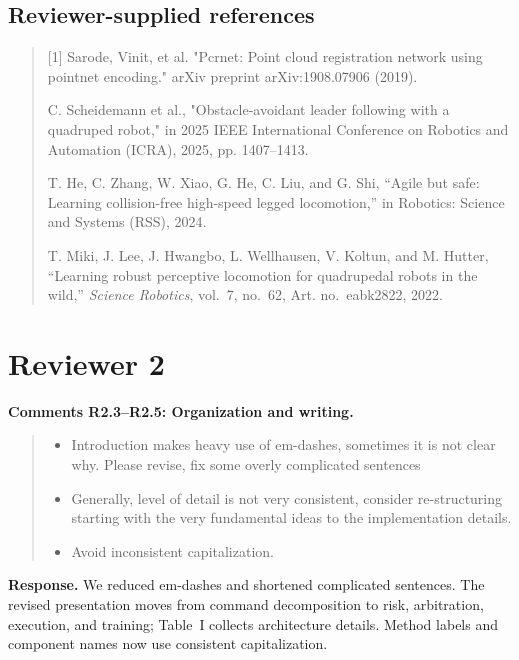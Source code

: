 \documentclass[letterpaper,11pt]{article}
\begin{document}
\subsection*{Reviewer-supplied references}
\begin{quote}\color{reviewgray}
[1] Sarode, Vinit, et al. "Pcrnet: Point cloud registration network using pointnet encoding." arXiv preprint arXiv:1908.07906 (2019).\par
[2] C. Scheidemann et al., "Obstacle-avoidant leader following with a quadruped robot," in 2025 IEEE International Conference on Robotics and Automation (ICRA), 2025, pp. 1407–1413.\par
[3] T. He, C. Zhang, W. Xiao, G. He, C. Liu, and G. Shi, “Agile but safe: Learning collision-free high-speed legged locomotion,” in Robotics: Science and Systems (RSS), 2024.\par
[4] T. Miki, J. Lee, J. Hwangbo, L. Wellhausen, V. Koltun, and M. Hutter, ``Learning robust perceptive locomotion for quadrupedal robots in the wild,'' \emph{Science Robotics}, vol.~7, no.~62, Art. no.~eabk2822, 2022.\par
\end{quote}
\section*{Reviewer 2}
\noindent\textbf{Comments R2.3--R2.5: Organization and writing.}
\begin{quote}\color{reviewgray}
\begin{itemize}[leftmargin=*,nosep,label={}]
\item[\textbf{R2.3.}] Introduction makes heavy use of em-dashes, sometimes it is not clear why. Please revise, fix some overly complicated sentences
\item[\textbf{R2.4.}] Generally, level of detail is not very consistent, consider re-structuring starting with the very fundamental ideas to the implementation details.
\item[\textbf{R2.5.}] Avoid inconsistent capitalization.
\end{itemize}
\end{quote}
\noindent\textbf{Response.}
We reduced em-dashes and shortened complicated sentences. The revised presentation moves from command decomposition to risk, arbitration, execution, and training; Table~I collects architecture details. Method labels and component names now use consistent capitalization.
\par\nopagebreak[4]
\end{document}
